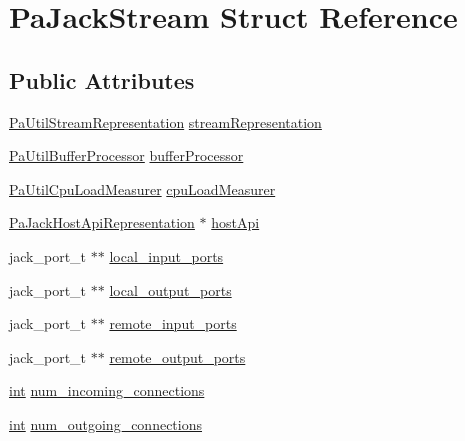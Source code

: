 \hypertarget{struct_pa_jack_stream}{}\section{Pa\+Jack\+Stream Struct Reference}
\label{struct_pa_jack_stream}
\subsection*{Public Attributes}
\begin{DoxyCompactItemize}
\item 
\hyperlink{struct_pa_util_stream_representation}{Pa\+Util\+Stream\+Representation} \hyperlink{struct_pa_jack_stream_ae04c2e7f23e9858dbcc3ec7c8f44a810}{stream\+Representation}
\item 
\hyperlink{struct_pa_util_buffer_processor}{Pa\+Util\+Buffer\+Processor} \hyperlink{struct_pa_jack_stream_a20b9a40e42f26c09691da1209f9fb7cb}{buffer\+Processor}
\item 
\hyperlink{struct_pa_util_cpu_load_measurer}{Pa\+Util\+Cpu\+Load\+Measurer} \hyperlink{struct_pa_jack_stream_af3286d0df7ea86579aeaeb0f81d559e8}{cpu\+Load\+Measurer}
\item 
\hyperlink{struct_pa_jack_host_api_representation}{Pa\+Jack\+Host\+Api\+Representation} $\ast$ \hyperlink{struct_pa_jack_stream_a23621ea90d67d042879358448ad6aca2}{host\+Api}
\item 
jack\+\_\+port\+\_\+t $\ast$$\ast$ \hyperlink{struct_pa_jack_stream_ab3d29e0bdd8072b82e516d3251e36545}{local\+\_\+input\+\_\+ports}
\item 
jack\+\_\+port\+\_\+t $\ast$$\ast$ \hyperlink{struct_pa_jack_stream_aa50ae53f3cad8933accd2754780a812c}{local\+\_\+output\+\_\+ports}
\item 
jack\+\_\+port\+\_\+t $\ast$$\ast$ \hyperlink{struct_pa_jack_stream_a53279160d9418868badbc177dccba78e}{remote\+\_\+input\+\_\+ports}
\item 
jack\+\_\+port\+\_\+t $\ast$$\ast$ \hyperlink{struct_pa_jack_stream_a4793965dd3b0f3b82b95532886587812}{remote\+\_\+output\+\_\+ports}
\item 
\hyperlink{xmltok_8h_a5a0d4a5641ce434f1d23533f2b2e6653}{int} \hyperlink{struct_pa_jack_stream_aafb405d93ffbd1c1c6c351c66ceef7ad}{num\+\_\+incoming\+\_\+connections}
\item 
\hyperlink{xmltok_8h_a5a0d4a5641ce434f1d23533f2b2e6653}{int} \hyperlink{struct_pa_jack_stream_a6fc39840c852acfbc486cfee93b96446}{num\+\_\+outgoing\+\_\+connections}
\item 

\end{DoxyCompactItemize}
